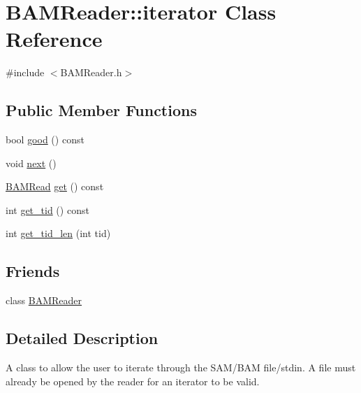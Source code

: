 \hypertarget{class_b_a_m_reader_1_1iterator}{
\section{BAMReader::iterator Class Reference}
\label{class_b_a_m_reader_1_1iterator}
}


{\ttfamily \#include $<$BAMReader.h$>$}

\subsection*{Public Member Functions}
\begin{DoxyCompactItemize}
\item 
bool \hyperlink{class_b_a_m_reader_1_1iterator_a0ab6687c9a5f309a4a2efddb92fdf284}{good} () const 
\item 
void \hyperlink{class_b_a_m_reader_1_1iterator_aa82ff5e9b564ed252e8bcea444894bea}{next} ()
\item 
\hyperlink{class_b_a_m_read}{BAMRead} \hyperlink{class_b_a_m_reader_1_1iterator_a71d10d5702031a805287d571d86467d5}{get} () const 
\item 
int \hyperlink{class_b_a_m_reader_1_1iterator_a49aaa89d863d0562248f3a049ff6d962}{get\_\-tid} () const 
\item 
int \hyperlink{class_b_a_m_reader_1_1iterator_a3176072f62b35beb0b1f8aab4f12273b}{get\_\-tid\_\-len} (int tid)
\end{DoxyCompactItemize}
\subsection*{Friends}
\begin{DoxyCompactItemize}
\item 
\hypertarget{class_b_a_m_reader_1_1iterator_af692f9f96824c5d2ce8191ebdc41d34d}{
class \hyperlink{class_b_a_m_reader_1_1iterator_af692f9f96824c5d2ce8191ebdc41d34d}{BAMReader}}
\label{class_b_a_m_reader_1_1iterator_af692f9f96824c5d2ce8191ebdc41d34d}

\end{DoxyCompactItemize}


\subsection{Detailed Description}
A class to allow the user to iterate through the SAM/BAM file/stdin. A file must already be opened by the reader for an iterator to be valid.

